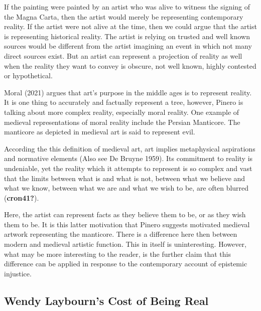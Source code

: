 \documentclass[
  letterpaper,
  DIV=11,
  numbers=noendperiod]{scrreprt}
\begin{document}
\begin{tcolorbox}[enhanced jigsaw, arc=.35mm, breakable, rightrule=.15mm, colback=white, colframe=quarto-callout-important-color-frame, bottomrule=.15mm, leftrule=.75mm, opacityback=0, toprule=.15mm, left=2mm]
\begin{tcolorbox}[enhanced jigsaw, arc=.35mm, breakable, rightrule=.15mm, colback=white, colframe=quarto-callout-tip-color-frame, bottomrule=.15mm, leftrule=.75mm, opacityback=0, toprule=.15mm, left=2mm]
If the painting were painted by an artist who was alive to witness the
signing of the Magna Carta, then the artist would merely be representing
contemporary reality. If the artist were not alive at the time, then we
could argue that the artist is representing historical reality. The
artist is relying on trusted and well known sources would be different
from the artist imagining an event in which not many direct sources
exist. But an artist can represent a projection of reality as well when
the reality they want to convey is obscure, not well known, highly
contested or hypothetical.

Moral (2021) argues that art's purpose in the middle ages is to
represent reality. It is one thing to accurately and factually represent
a tree, however, Pinero is talking about more complex reality,
especially moral reality. One example of medieval representations of
moral reality include the Persian Manticore. The manticore as depicted
in medieval art is said to represent evil.

According the this definition of medieval art, art implies metaphysical
aspirations and normative elements (Also see De Bruyne 1959). Its
commitment to reality is undeniable, yet the reality which it attempts
to represent is so complex and vast that the limits between what is and
what is not, between what we believe and what we know, between what we
are and what we wish to be, are often blurred (\textbf{cron41?}).

Here, the artist can represent facts as they believe them to be, or as
they wish them to be. It is this latter motivation that Pinero suggests
motivated medieval artwork representing the manticore. There is a
difference here then between modern and medieval artistic function. This
in itself is uninteresting. However, what may be more interesting to the
reader, is the further claim that this difference can be applied in
response to the contemporary account of epistemic injustice.

\subsection{Wendy Laybourn's Cost of Being
Real}\label{wendy-laybourns-cost-of-being-real-2}


\end{tcolorbox}
\end{tcolorbox}
\end{document}
